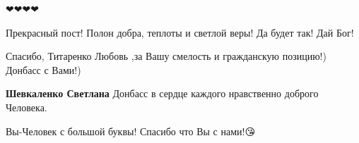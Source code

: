 \begin{itemize}
 
❤❤❤❤

 
Прекрасный пост! Полон добра, теплоты и светлой веры! Да будет так! Дай Бог!

 
Спасибо, Титаренко Любовь ,за Вашу смелость и гражданскую позицию!) Донбасс с Вами!)

\begin{itemize}
 
\textbf{Шевкаленко Светлана} Донбасс в сердце каждого нравственно доброго Человека.
\end{itemize}

 
Вы-Человек с большой буквы! Спасибо что Вы с нами!😘🥰💞🌹

\end{itemize}

